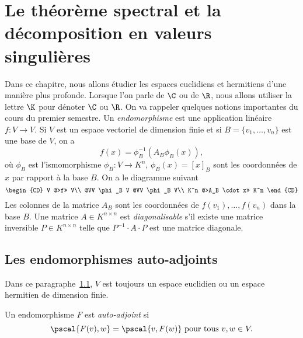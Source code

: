 \chapter{Le théorème spectral et la décomposition en valeurs singulières}

\label{cha:appl-auto-adjo}

Dans ce chapitre, nous allons étudier les espaces euclidiens et hermitiens d'une manière plus profonde. Lorsque l'on parle de $\C$ ou de $\R$, nous allons utiliser la lettre $\K$ pour dénoter $\C$ ou $\R$. On va rappeler quelques notions importantes du cours du premier semestre. Un \emph{endomorphisme}  est une application linéaire $f \colon V \longrightarrow V$. Si $V$ est un espace vectoriel de dimension finie et si $B = \{v_1,\dots,v_n\}$ est une base de $V$, on a 
\begin{displaymath}
  f(x) = \phi_B^{-1} (A_B \phi_B(x)),
\end{displaymath}
où $\phi_B$ est l'ismomorphisme $\phi_B \colon V \longrightarrow K^n$, $\phi_B(x) = [x]_B$ sont les coordonnées de $x$ par rapport à la base $B$. On a le diagramme suivant 
\begin{displaymath}
  {
  \begin{CD}
    V     @>f>>  V\\
    @VV \phi_B V        @VV \phi_B V\\ 
    K^n     @>A_B \cdot x>>  K^n
  \end{CD}} 
\end{displaymath} 
Les colonnes de la matrice $A_B$ sont les coordonnées de $f(v_1),\dots,f(v_n)$ dans la base $B$. 
Une matrice $A \in K^{n \times n}$ est \emph{diagonalisable} s'il existe une matrice inversible $P \in K^{n \times n}$ telle que $P^{-1}\cdot A \cdot P$ est une matrice diagonale. 

\section{Les endomorphismes auto-adjoints} 

\label{sec:les-endom-auto}
\begin{framed}\noindent 
  Dans ce paragraphe~\ref{sec:les-endom-auto},  $V$
  est toujours un espace euclidien ou un espace hermitien de dimension finie. 
\end{framed}

\begin{definition}
\label{def:19}
Un endomorphisme $F$ est \emph{auto-adjoint} si 
\begin{displaymath}
  \pscal{F(v),w} = \pscal{v,F(w)} \text{ pour tous } v,w \in V. 
\end{displaymath}
\end{definition}

